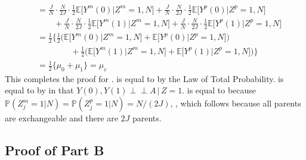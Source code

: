 \documentclass[12pt]{extarticle}
\newcommand{\ind}{\perp\!\!\!\!\perp}
\newcommand{\pp}{\mathbb{P}}
\newcommand{\E}{\mathbb{E}}
\newcommand{\nind}{J}
\begin{document}
{\begin{align}
\ &= \frac{\nind}{N}\cdot \frac{N}{2\nind}\cdot \frac{1}{2}\E\big[Y^m(0)\big|Z^m=1,N\big] + \frac{\nind}{N}\cdot \frac{N}{2\nind}\cdot \frac{1}{2} \E\big[Y^p(0)\big|Z^p=1,N\big] \nonumber \\
\ & \qquad + \frac{\nind}{N}\cdot \frac{N}{2\nind}\cdot \frac{1}{2}\E\big[Y^m(1)\big|Z^m=1,N\big] + \frac{\nind}{N}\cdot \frac{N}{2\nind}\cdot \frac{1}{2} \E\big[Y^p(1)\big|Z^p=1,N\big] \tag{A4.e} \label{eq:b5} \\
\ & = \frac{1}{2}\Big\{\frac{1}{2}\big(\E\big[Y^m(0)\big|Z^m=1,N\big]+\E\big[Y^p(0)\big|Z^p=1,N\big]\big) \nonumber \\
\ & \qquad \qquad + \frac{1}{2}\big(\E\big[Y^m(1)\big|Z^m=1,N\big]+\E\big[Y^p(1)\big|Z^p=1,N\big]\big)\Big\} \nonumber \\
\ & = \frac{1}{2}\Big\{\mu_0 + \mu_1 \Big\} = \mu_c \nonumber
\end{align}}This completes the proof for .  is equal to  by the Law of Total Probability.  is equal to  by  in that $Y(0),Y(1) \ind A \, \big| \, Z=1$.  is equal to  because $\pp(Z^m_j=1 | N) = \pp(Z^p_j=1 | N) = N/(2J)$, , which follows because all parents are exchangeable and there are $2J$ parents. 

\subsection{Proof of  Part B} \label{app:dtmt_unbiased_centered}
\end{document}
